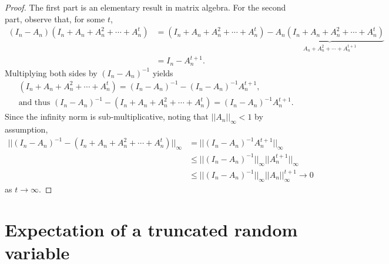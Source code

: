 \documentclass[11pt, A4paper, openany, uplatex]{book}
\begin{document}
\begin{appendices}
\begin{proof}
	The first part is an elementary result in matrix algebra. 
	For the second part, observe that, for some $t$,
	\begin{align*}
	(I_n - A_n) (I_n + A_n + A_n^2 + \cdots + A_n^t) 
	& =  (I_n + A_n + A_n^2 + \cdots + A_n^t)  -  \underbrace{A_n (I_n + A_n + A_n^2 + \cdots + A_n^t) }_{A_n + A_n^2 + \cdots + A_n^{t+1}} \\
	& = I_n - A_n^{t+1}.
	\end{align*}
	Multiplying both sides by $(I_n - A_n)^{-1}$ yields
	\begin{align*}
	& (I_n + A_n + A_n^2 + \cdots + A_n^t)  =   (I_n - A_n)^{-1} - (I_n - A_n)^{-1}A_n^{t+1}, \\
	& \text{and thus } (I_n - A_n)^{-1} - (I_n + A_n + A_n^2 + \cdots + A_n^t) =  (I_n - A_n)^{-1}A_n^{t+1}.
	\end{align*}
	Since the infinity norm is sub-multiplicative, noting that $||A_n||_\infty < 1$ by assumption,
	\begin{align*}
	|| (I_n - A_n)^{-1} - (I_n + A_n + A_n^2 + \cdots + A_n^t)||_\infty 
	& =  ||(I_n - A_n)^{-1}A_n^{t+1}||_\infty \\
	& \le  ||(I_n - A_n)^{-1}||_\infty ||A_n^{t+1}||_\infty \\
	& \le  ||(I_n - A_n)^{-1}||_\infty ||A_n||^{t+1}_\infty \to 0
	\end{align*}
	as $t \to \infty$.
\end{proof}

\section{Expectation of a truncated random variable}\label{sec:truncate}


\end{appendices}
\end{document}
